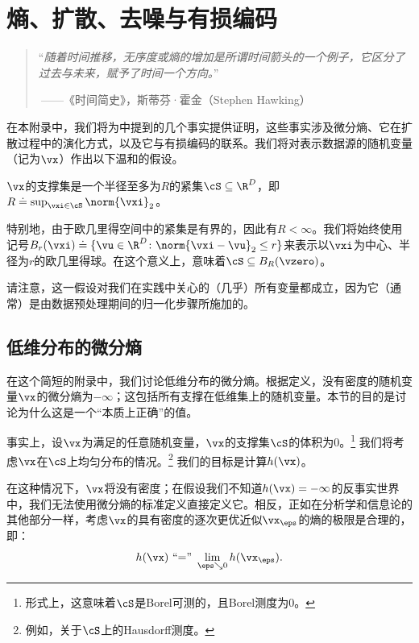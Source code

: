 \documentclass[../../book-main_zh.tex]{subfiles}
\begin{document}
\chapter{熵、扩散、去噪与有损编码}\label{app:entropy}

\begin{quote}
    ``{\em 随着时间推移，无序度或熵的增加是所谓时间箭头的一个例子，它区分了过去与未来，赋予了时间一个方向。}''

    $~$\hfill ——《时间简史》，斯蒂芬·霍金（Stephen Hawking）
\end{quote}
\vspace{5mm}

在本附录中，我们将为中提到的几个事实提供证明，这些事实涉及微分熵、它在扩散过程中的演化方式，以及它与有损编码的联系。我们将对表示数据源的随机变量（记为\(\vx\)）作出以下温和的假设。

\begin{assumption}\label{assumption:entropy_x_compact_support}
    \(\vx\)的支撑集是一个半径至多为\(R\)的紧集\(\cS \subseteq \R^{D}\)，即\(R \doteq \sup_{\vxi \in \cS}\norm{\vxi}_{2}\)。
\end{assumption}

特别地，由于欧几里得空间中的紧集是有界的，因此有\(R < \infty\)。我们将始终使用记号\(B_{r}(\vxi) \doteq \{\vu \in \R^{D} \colon \norm{\vxi - \vu}_{2}
\leq r\}\)来表示以\(\vxi\)为中心、半径为\(r\)的欧几里得球。在这个意义上，意味着\(\cS \subseteq B_{R}(\vzero)\)。

请注意，这一假设对我们在实践中关心的（几乎）所有变量都成立，因为它（通常）是由数据预处理期间的归一化步骤所施加的。

\section{低维分布的微分熵}\label{sec:low_dim_entropy}

在这个简短的附录中，我们讨论低维分布的微分熵。根据定义，没有密度的随机变量\(\vx\)的微分熵为\(-\infty\)；这包括所有支撑在低维集上的随机变量。本节的目的是讨论为什么这是一个“本质上正确”的值。

事实上，设\(\vx\)为满足的任意随机变量，\(\vx\)的支撑集\(\cS\)的体积为\(0\)。\footnote{形式上，这意味着\(\cS\)是Borel可测的，且Borel测度为\(0\)。} 我们将考虑\(\vx\)在\(\cS\)上均匀分布的情况。\footnote{例如，关于\(\cS\)上的Hausdorff测度。} 我们的目标是计算\(h(\vx)\)。

在这种情况下，\(\vx\)将没有密度；在假设我们不知道\(h(\vx) = -\infty\)的反事实世界中，我们无法使用微分熵的标准定义直接定义它。相反，正如在分析学和信息论的其他部分一样，考虑\(\vx\)的具有密度的逐次更优近似\(\vx_{\eps}\)的熵的极限是合理的，即：
\begin{equation}
    h(\vx)\ \text{``=''}\ \lim_{\eps \searrow 0}h(\vx_{\eps}).
\end{equation}
\end{document}
